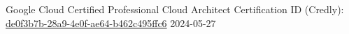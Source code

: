 \awarditem
{Google Cloud Certified Professional Cloud Architect}
{\companygoogle}
{Certification ID (Credly): \href{https://www.credly.com/badges/de0f3b7b-28a9-4e0f-ae64-b462c495ffc6}{de0f3b7b-28a9-4e0f-ae64-b462c495ffc6}}
{2024-05-27}
